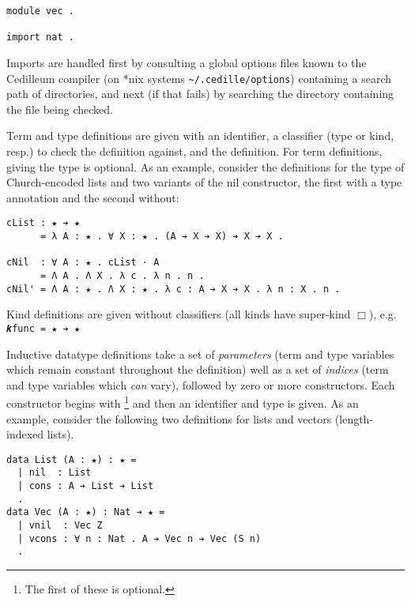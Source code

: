 \documentclass{article}
\begin{document}
\begin{verbatim}
module vec .

import nat .
\end{verbatim}

\noindent Imports are handled first by consulting a global options files
known to the Cedilleum compiler (on *nix systems \verb|~/.cedille/options|)
containing a search path of directories, and next (if that fails) by searching
the directory containing the file being checked.

Term and type definitions are given with an identifier, a classifier (type or
kind, resp.) to check the definition against, and the definition. For term
definitions, giving the type is optional. As an example, consider the
definitions for the type of Church-encoded lists and two variants of the nil
constructor, the first with a type annotation and the second without:

\begin{verbatim}
cList : ★ ➔ ★
      = λ A : ★ . ∀ X : ★ . (A ➔ X ➔ X) ➔ X ➔ X .

cNil  : ∀ A : ★ . cList · A
      = Λ A . Λ X . λ c . λ n . n .
cNil' = Λ A : ★ . Λ X : ★ . λ c : A ➔ X ➔ X . λ n : X . n .
\end{verbatim}

Kind definitions are given without classifiers (all kinds have super-kind
$\Box$), e.g. \verb;𝒌func = ★ ➔ ★;

Inductive datatype definitions take a set of \textit{parameters} (term and type
variables which remain constant throughout the definition) well as a set of
\textit{indices} (term and type variables which \textit{can} vary), followed by
zero or more constructors. Each constructor begins with
\textbf{\textbar}\footnote{The first of these is optional.} and then an
identifier and type is given. As an example, consider the following two
definitions for lists and vectors (length-indexed lists).

\begin{verbatim}
data List (A : ★) : ★ =
  | nil  : List
  | cons : A ➔ List ➔ List
  .
data Vec (A : ★) : Nat ➔ ★ =
  | vnil  : Vec Z
  | vcons : ∀ n : Nat . A ➔ Vec n ➔ Vec (S n)
  .
\end{verbatim}
\end{document}
